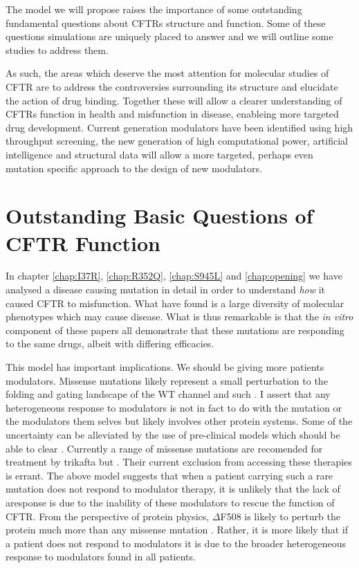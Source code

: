 The model we will propose raises the importance of some outstanding fundamental questions about CFTRs structure and function. Some of these questions simulations are uniquely placed to answer and we will outline some studies to address them. 

As such, the areas which deserve the most attention for molecular studies of CFTR are to address the controversies surrounding its structure and elucidate the action of drug binding. Together these will allow a clearer understanding of CFTRs function in health and misfunction in disease, enableing more targeted drug development. Current generation modulators have been identified using high throughput screening, the new generation of high computational power, artificial intelligence and structural data will allow a more targeted, perhaps even mutation specific approach to the design of new modulators.

\section{Outstanding Basic Questions of CFTR Function}
In chapter \ref{chap:I37R}, \ref{chap:R352Q}, \ref{chap:S945L} and \ref{chap:opening} we have analysed a disease causing mutation in detail in order to understand \textit{how} it caused CFTR to misfunction. What have found is a large diversity of molecular phenotypes which may cause disease. What is thus remarkable is that the \textit{in vitro} component of these papers all demonstrate that these mutations are responding to the same drugs, albeit with differing efficacies.


This model has important implications. We should be giving more patients modulators. Missense mutations likely represent a small perturbation to the folding and gating landscape of the WT channel and such . I assert that any heterogeneous response to modulators is not in fact to do with the mutation or the modulators them selves but likely involves other protein systems. Some of the uncertainty can be alleviated by the use of pre-clinical models which should be able to clear . Currently a range of missense mutations are recomended for treatment by trikafta but . Their current exclusion from accessing these therapies is errant. The above model suggests that when a patient carrying such a rare mutation does not respond to modulator therapy, it is unlikely that the lack of aresponse is due to the inability of these modulators to rescue the function of CFTR. From the perspective of protein physics, $\Delta$F508 is likely to perturb the protein much more than any missense mutation \cite{}. Rather, it is more likely that if a patient does not respond to modulators it is due to the broader heterogeneous response to modulators found in all patients. 


